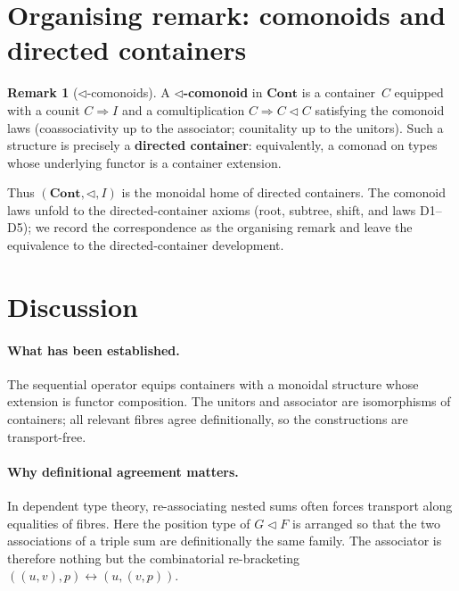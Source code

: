 \documentclass[11pt,a4paper]{article}
\theoremstyle{plain}
\theoremstyle{definition}
\newtheorem{remark}[theorem]{Remark}
\newcommand{\Cont}{\mathbf{Cont}}
\newcommand{\seqop}{\mathbin{\triangleleft}}
\begin{document}
\section{Organising remark: comonoids and directed containers}

\begin{remark}[$\seqop$-comonoids]
A \textbf{$\seqop$-comonoid} in $\Cont$ is a container~$C$ equipped with
a counit $C \Rightarrow I$ and a comultiplication
$C \Rightarrow C \seqop C$ satisfying the comonoid laws (coassociativity
up to the associator; counitality up to the unitors). Such a structure is
precisely a \textbf{directed container}: equivalently, a comonad on
types whose underlying functor is a container extension.

Thus $(\Cont, \seqop, I)$ is the monoidal home of directed containers.
The comonoid laws unfold to the directed-container axioms (root,
subtree, shift, and laws D1--D5); we record the correspondence as the
organising remark and leave the equivalence to the directed-container
development.
\end{remark}

\section{Discussion}

\paragraph{What has been established.}
The sequential operator equips containers with a monoidal structure
whose extension is functor composition. The unitors and associator are
isomorphisms of containers; all relevant fibres agree definitionally, so
the constructions are transport-free.

\paragraph{Why definitional agreement matters.}
In dependent type theory, re-associating nested sums often forces
transport along equalities of fibres. Here the position type of
$G \seqop F$ is arranged so that the two associations of a triple sum
are definitionally the same family. The associator is therefore nothing
but the combinatorial re-bracketing
$((u,v),p) \leftrightarrow (u,(v,p))$.
\end{document}
